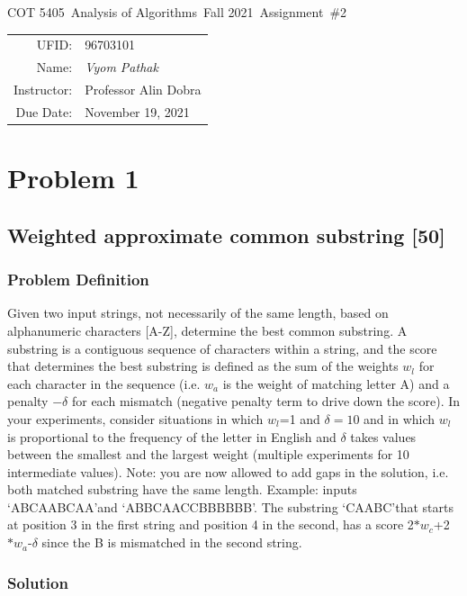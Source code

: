 \documentclass{article}
\newcommand{\hmwkTitle}{Assignment\ \#2}
\newcommand{\hmwkDueDate}{November 19, 2021}
\newcommand{\hmwkClassCode}{COT 5405}
\newcommand{\hmwkClass}{Analysis of Algorithms}
\newcommand{\hmwkClassYear}{Fall 2021}
\newcommand{\hmwkClassInstructor}{Professor Alin Dobra}
\newcommand{\hmwkAuthorName}{\textit{Vyom Pathak}}
\newcommand{\hmwkUFID}{96703101}
\begin{document}
\begin{center}
{\Large \hmwkClassCode\ \hmwkClass\ \hmwkClassYear\ \hmwkTitle}

\begin{tabular}{rl}
UFID: & \hmwkUFID \\
Name: & \hmwkAuthorName \\
Instructor: & \hmwkClassInstructor \\
Due Date: & \hmwkDueDate \\ 
\end{tabular}
\end{center}

\section*{Problem 1}
\subsection*{Weighted approximate common substring [50]}
\subsubsection{Problem Definition}
Given two input strings, not necessarily of the same length, based on alphanumeric characters [A-Z], determine the best common substring. A substring is a contiguous sequence of characters within a string, and the score that determines the best substring is defined as the sum of the weights $w_l$ for each character in the sequence (i.e. $w_a$ is the weight of matching letter A) and a penalty $-\delta$ for each mismatch (negative penalty term to drive down the score). In your experiments, consider situations in which $w_l$=1 and $\delta=10$ and in which $w_l$ is proportional to the frequency of the letter in English and $\delta$ takes values between the smallest and the largest weight (multiple experiments for 10 intermediate values). Note: you are now allowed to add gaps in the solution, i.e. both matched substring have the same length. Example: inputs \lq ABCAABCAA\rq and \lq ABBCAACCBBBBBB\rq. The substring \lq CAABC\rq that starts at position 3 in the first string and position 4 in the second,  has a score 2$*w_c$+2$*w_a$-$\delta$ since the B is mismatched in the second string.
\subsubsection*{Solution}
\end{document}
